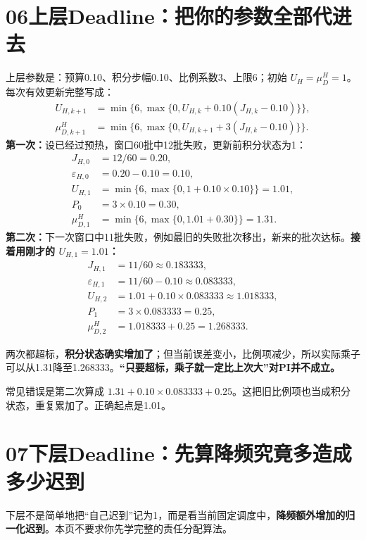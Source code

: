 \documentclass[UTF8,11pt,a4paper,fontset=fandol]{ctexart}
\newcommand{\lesson}[2]{\section*{#1\quad #2}}
\begin{document}
\newpage
\lesson{06}{上层Deadline：把你的参数全部代进去}
上层参数是：预算0.10、积分步幅0.10、比例系数3、上限6；初始 $U_H=\mu_D^H=1$。每次有效更新完整写成：
\begin{align*}
U_{H,k+1}&=\min\{6,\max\{0,U_{H,k}+0.10(J_{H,k}-0.10)\}\},\\
\mu_{D,k+1}^H&=\min\{6,\max\{0,U_{H,k+1}+3(J_{H,k}-0.10)\}\}.
\end{align*}
\textbf{第一次：}设已经过预热，窗口60批中12批失败，更新前积分状态为1：
\begin{align*}
J_{H,0}&=12/60=0.20,\\
\varepsilon_{H,0}&=0.20-0.10=0.10,\\
U_{H,1}&=\min\{6,\max\{0,1+0.10\times0.10\}\}=1.01,\\
P_0&=3\times0.10=0.30,\\
\mu_{D,1}^H&=\min\{6,\max\{0,1.01+0.30\}\}=1.31.
\end{align*}
\textbf{第二次：}下一次窗口中11批失败，例如最旧的失败批次移出，新来的批次达标。\textbf{接着用刚才的 $U_{H,1}=1.01$：}
\begin{align*}
J_{H,1}&=11/60\approx0.183333,\\
\varepsilon_{H,1}&=11/60-0.10\approx0.083333,\\
U_{H,2}&=1.01+0.10\times0.083333\approx1.018333,\\
P_1&=3\times0.083333=0.25,\\
\mu_{D,2}^H&=1.018333+0.25=1.268333.
\end{align*}
\begin{remember}
两次都超标，\textbf{积分状态确实增加了}；但当前误差变小，比例项减少，所以实际乘子可以从1.31降至1.268333。\textbf{“只要超标，乘子就一定比上次大”对PI并不成立。}
\end{remember}
常见错误是第二次算成 $1.31+0.10\times0.083333+0.25$。这把旧比例项也当成积分状态，重复累加了。正确起点是1.01。

\newpage
\lesson{07}{下层Deadline：先算降频究竟多造成多少迟到}
下层不是简单地把“自己迟到”记为1，而是看当前固定调度中，\textbf{降频额外增加的归一化迟到}。本页不要求你先学完整的责任分配算法。
\end{document}
